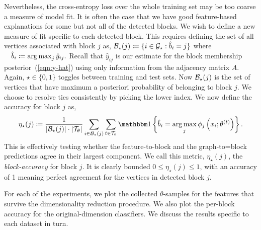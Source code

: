 Nevertheless, the cross-entropy loss over the whole training set may be too coarse a measure of model fit. It is often the case that we have good feature-based explanations for some but not all of the detected blocks. We wish to define a new measure of fit specific to each detected block. This requires defining the set of all vertices associated with block $j$ as,
$
	\mathcal{B}_\star(j) \coloneqq \{i \in \mathcal{G}_\star : \hat{b}_i = j\}
$
where
$ 
	\quad \hat{b}_i \coloneqq \operatorname*{arg\,max}_j \hat{y}_{ij}.
$
Recall that $\hat{y}_{ij}$ is our estimate for the block membership posterior~(\ref{eqn:y-hat}) using only information from the adjacency matrix $A$. Again, $\star \in \{0, 1\}$ toggles between training and test sets. Now $\mathcal{B}_\star(j)$ is the set of vertices that have maximum a posteriori probability of belonging to block $j$. We choose to resolve ties consistently by picking the lower index. We now define the accuracy for block $j$ as,
%
\begin{equation}
	\eta_\star(j) \coloneqq \frac{1}{|\Bcal_\star (j)| \cdot 
	|\Tcal_\theta| } 
	\sum_{i \in \Bcal_\star (j)}  \sum_{t \in \Tcal_\theta}
	\one \left\{\hat{b}_i = \argmax_j \phi_j \left( x_i; \theta^{(t)} \right) \right\}.
	\label{eqn:accuracy}
\end{equation}
%
This is effectively testing whether the feature-to-block and the graph-to=block predictions agree in their largest component. We call this metric, $\eta_\star(j)$, the {\em block-accuracy} for block $j$. It is clearly bounded $0 \leq \eta_\star(j) \leq 1$, with an accuracy of 1 meaning perfect agreement for the vertices in detected block $j$.

For each of the experiments, we plot the collected $\theta$-samples for the features that survive the dimensionality reduction procedure. We also plot the per-block accuracy for the original-dimension classifiers. We discuss the results specific to each dataset in turn.



\clearpage